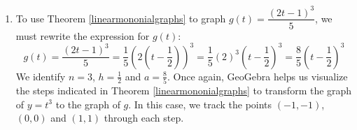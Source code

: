 \documentclass{ximera}
\begin{document}
\begin{example}
\begin{enumerate}

 



 



 
 
 The domain here is $(-\infty, \infty)$ while the range is $(-\infty, 3]$.
 
 \item To use Theorem \ref{linearmononialgraphs} to graph $g(t) = \dfrac{(2t-1)^3}{5}$, we must rewrite the expression for $g(t)$: \[ g(t) =  \dfrac{(2t-1)^3}{5} = \frac{1}{5} \left( 2 \left(t - \frac{1}{2} \right) \right)^3 = \frac{1}{5} (2)^3  \left( t - \frac{1}{2} \right)^3 = \frac{8}{5} \left( t - \frac{1}{2} \right)^3 \] We identify $n = 3$, $h = \frac{1}{2}$ and $a  = \frac{8}{5}$.  Once again,  GeoGebra helps us visualize the steps indicated in Theorem \ref{linearmononialgraphs} to transform the graph of $y = t^3$ to the graph of $g$.  In this case, we track the points $(-1,-1)$, $(0,0)$ and $(1,1)$ through each step.


\end{enumerate}
\end{example}
\end{document}
